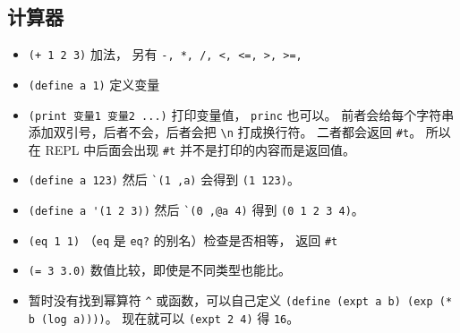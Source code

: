 \subsection{计算器}
\begin{itemize}
\item \verb`(+ 1 2 3)` 加法， 另有 \verb`-, *, /, <, <=, >, >=, `
\item \verb`(define a 1)` 定义变量
\item \verb`(print 变量1 变量2 ...)` 打印变量值， \verb`princ` 也可以。 前者会给每个字符串添加双引号，后者不会，后者会把 \verb`\n` 打成换行符。 二者都会返回 \verb`#t`。 所以在 REPL 中后面会出现 \verb`#t` 并不是打印的内容而是返回值。
\item \verb`(define a 123)` 然后 \verb|`(1 ,a)| 会得到 \verb`(1 123)`。
\item \verb`(define a '(1 2 3))` 然后 \verb|`(0 ,@a 4)| 得到 \verb`(0 1 2 3 4)`。
\item \verb`(eq 1 1)` （\verb`eq` 是 \verb`eq?` 的别名）检查是否相等， 返回 \verb`#t`
\item \verb`(= 3 3.0)` 数值比较，即使是不同类型也能比。
\item 暂时没有找到幂算符 \verb`^` 或函数，可以自己定义 \verb`(define (expt a b) (exp (* b (log a))))`。 现在就可以 \verb`(expt 2 4)` 得 \verb`16`。
\end{itemize}

